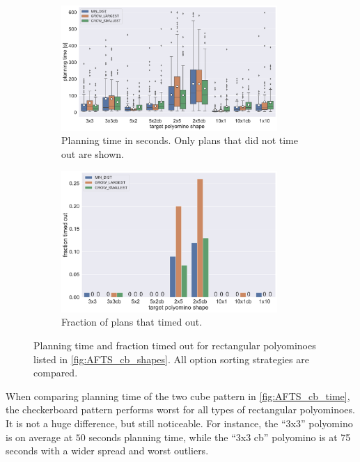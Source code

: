 \begin{figure}
	\centering
	\begin{subfigure}[b]{\textwidth}
		\centering
		\includegraphics[width=0.9\textwidth]{figures/plots/AFTS_cb_time.pdf}
		\caption{Planning time in seconds. Only plans that did not time out are shown.}
		\label{fig:AFTS_cb_time}
	\end{subfigure}
	
	\begin{subfigure}[b]{\textwidth}
		\centering
		\includegraphics[width=0.9\textwidth]{figures/plots/AFTS_cb_timeout.pdf}
		\caption{Fraction of plans that timed out.}
		\label{fig:AFTS_cb_timeout}
	\end{subfigure}
	\caption[Planning time and fraction timed out for rectangular polyominoes]{Planning time and fraction timed out for rectangular polyominoes listed in \autoref{fig:AFTS_cb_shapes}. All option sorting strategies are compared.}
	\label{fig:AFTS_cb_timestats}
\end{figure}

When comparing planning time of the two cube pattern in \autoref{fig:AFTS_cb_time}, the checkerboard pattern performs worst for all types of rectangular polyominoes.
It is not a huge difference, but still noticeable.
For instance, the ``3x3'' polyomino is on average at $50$ seconds planning time, while the ``3x3 cb'' polyomino is at 75 seconds with a wider spread and worst outliers.

